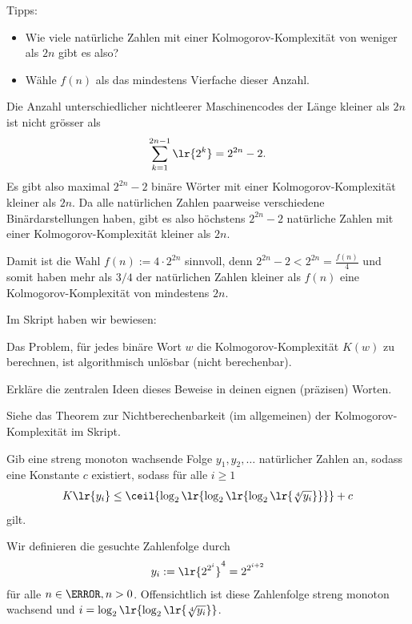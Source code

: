 \begin{questions}
    Tipps:
    \begin{itemize}
        \item Wie viele natürliche Zahlen mit einer Kolmogorov-Komplexität von weniger als $2n$ gibt es also?
        \item Wähle $f(n)$ als das mindestens Vierfache dieser Anzahl.
    \end{itemize}
	\begin{solution}
		Die Anzahl unterschiedlicher nichtleerer Maschinencodes der Länge kleiner als $2n$ ist nicht grösser als
		\begin{align*}
			\sum_{k = 1}^{2n-1}\lr{2^k} = 2^{2n} - 2.
		\end{align*}
		Es gibt also maximal $2^{2n} - 2$ binäre Wörter mit einer Kolmogorov-Komplexität kleiner als $2n$. Da alle natürlichen Zahlen paarweise verschiedene Binärdarstellungen haben, gibt es also höchstens $2^{2n} - 2$ natürliche Zahlen mit einer Kolmogorov-Komplexität kleiner als $2n$.

		\vspace{\baselineskip}
		Damit ist die Wahl $f(n):= 4 \cdot 2^{2n}$ sinnvoll, denn $2^{2n} - 2 < 2^{2n} = \frac{f(n)}{4}$ und somit haben mehr als $3/4$ der natürlichen Zahlen kleiner als $f(n)$ eine Kolmogorov-Komplexität von mindestens $2n$.
	\end{solution}
	
	\question[2] Im Skript haben wir bewiesen:
	\begin{center}
        Das Problem, für jedes binäre Wort $w$ die Kolmogorov-Komplexität $K(w)$ zu berechnen, ist algorithmisch unlösbar (nicht berechenbar).
	\end{center}
    Erkläre die zentralen Ideen dieses Beweise in deinen eignen (präzisen) Worten.
	\begin{solution}
		Siehe das Theorem zur Nichtberechenbarkeit (im allgemeinen) der Kolmogorov-Komplexität im Skript.
	\end{solution}

	\question[2] Gib eine streng monoton wachsende Folge $y_1,y_2,\ldots$ natürlicher Zahlen an, sodass eine Konstante $c$ existiert, sodass für alle $i\geq 1$
	\begin{align*}
		K\lr{y_i} \leq \ceil{\log_2\lr{\log_2\lr{\log_2\lr{\sqrt[4]{y_i}}}}} + c
	\end{align*}
	gilt.
	\begin{solution}
		Wir definieren die gesuchte Zahlenfolge durch
		\begin{align*}
			y_i := \lr{2^{2^i}}^4 = 2^{2^{i+2}}
		\end{align*}
		für alle $n\in\N, n>0$. Offensichtlich ist diese Zahlenfolge streng monoton wachsend und $i = \log_2\lr{\log_2\lr{\sqrt[4]{y_i}}}$.


\end{solution}
\end{questions}
